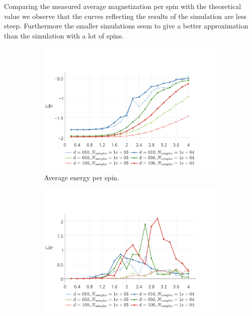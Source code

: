 	Comparing the measured average magnetization per spin with the theoretical value we observe that the curves reflecting the results of the simulation are less steep. Furthermore the smaller simulations seem to give a better approximation than the simulation with a lot of spins. 

	\begin{figure}
		\centering
		\begin{subfigure}{\columnwidth}
			\centering
			\includegraphics[width=\textwidth]{./img/2D/averageEnergy}
			\caption{Average energy per spin.}
			\label{fig:results:2D:averageEnergy}
		\end{subfigure}
		\begin{subfigure}{\columnwidth}
			\centering
			\includegraphics[width=\textwidth]{./img/2D/specificHeat}

\end{subfigure}
\end{figure}
